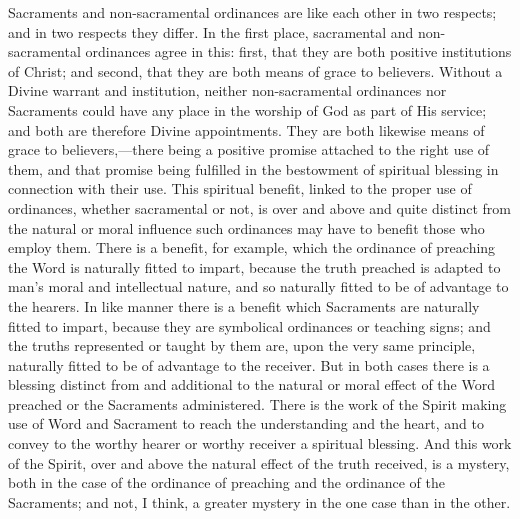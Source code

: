 \documentclass[english,]{book}
\begin{document}
Sacraments and non-sacramental ordinances are like each other in two respects; and in two respects they differ. In the first place, sacramental and non-sacramental ordinances agree in this: first, that they are both positive institutions of Christ; and second, that they are both means of grace to believers. Without a Divine warrant and institution, neither non-sacramental ordinances nor Sacraments could have any place in the worship of God as part of His service; and both are therefore Divine appointments. They are both likewise means of grace to believers,---there being a positive promise attached to the right use of them, and that promise being fulfilled in the bestowment of spiritual blessing in connection with their use. This spiritual benefit, linked to the proper use of ordinances, whether sacramental or not, is over and above and quite distinct from the natural or moral influence such ordinances may have to benefit those who employ them. There is a benefit, for example, which the ordinance of preaching the Word is naturally fitted to impart, because the truth preached is adapted to man's moral and intellectual nature, and so naturally fitted to be of advantage to the hearers. In like manner there is a benefit which Sacraments are naturally fitted to impart, because they are symbolical ordinances or teaching signs; and the truths represented or taught by them are, upon the very same principle, naturally fitted to be of advantage to the receiver. But in both cases there is a blessing distinct from and additional to the natural or moral effect of the Word preached or the Sacraments administered. There is the work of the Spirit making use of Word and Sacrament to reach the understanding and the heart, and to convey to the worthy hearer or worthy receiver a spiritual blessing. And this work of the Spirit, over and above the natural effect of the truth received, is a mystery, both in the case of the ordinance of preaching and the ordinance of the Sacraments; and not, I think, a greater mystery in the one case than in the other.
\end{document}
